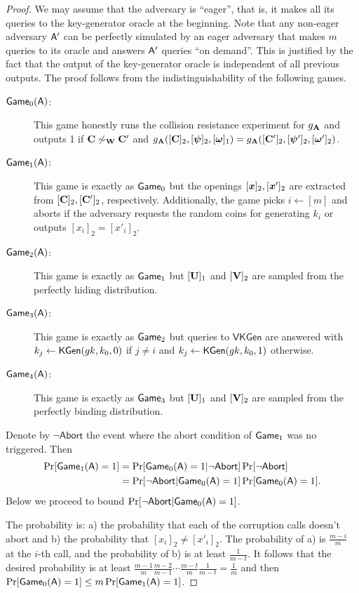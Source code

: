 \begin{proof}
We may assume that the adversary is ``eager'', that is, it makes all its queries to the key-generator oracle at the beginning. Note that any non-eager adversary $\mathsf{A}'$ can be perfectly simulated  by an eager adversary that makes $m$ queries to its oracle and answers $\mathsf{A}'$ queries ``on demand''. This is justified by the fact that the output of the key-generator oracle is independent of all previous outputs.
The proof follows from the indistinguishability of the following games.
\begin{description}
\item[$\mathsf{Game}_0(\mathsf{A})$:] This game honestly runs the collision resistance experiment for $g_{\mathbf{{A}}}$ and outputs 1 if $\mathbf{{C}} \not\sim_{\mathbf{{W}}} \mathbf{{C}}'$ and $g_{\mathbf{{A}}}([\mathbf{{C}}]_2,[{\boldsymbol{\psi}}]_2,[{\boldsymbol{\omega}}]_1)=g_{\mathbf{{A}}}([\mathbf{{C}}']_2,[{\boldsymbol{\psi}}']_2,\allowbreak[{\boldsymbol{\omega}}']_2)$.
\item[$\mathsf{Game}_1(\mathsf{A})$:] This game is exactly as $\mathsf{Game}_0$ but the openings $[{\boldsymbol{x}}]_2,[{\boldsymbol{x}}']_2$ are extracted from $[\mathbf{{C}}]_2,[\mathbf{{C}}']_2$, respectively. Additionally, the game picks $i\gets[m]$ and aborts if the adversary requests the random coins for generating $k_i$ or outputs $[x_i]_2=[x'_i]_2$.
\item[$\mathsf{Game}_2(\mathsf{A})$:] This game is exactly as $\mathsf{Game}_1$ but $[\mathbf{{U}}]_1$ and $[\mathbf{{V}}]_2$ are sampled from the perfectly hiding distribution.
\item[$\mathsf{Game}_3(\mathsf{A})$:] This game is exactly as $\mathsf{Game}_2$ but queries to $\mathsf{VKGen}$ are answered with $k_j\gets\mathsf{KGen}(gk,k_0,0)$ if $j\neq i$ and $k_j\gets\mathsf{KGen}(gk,k_0,1)$ otherwise.
\item[$\mathsf{Game}_4(\mathsf{A})$:] This game is exactly as $\mathsf{Game}_3$ but $[\mathbf{{U}}]_1$ and $[\mathbf{{V}}]_2$ are sampled from the perfectly binding distribution.
\end{description}
Denote by $\neg\mathsf{Abort}$ the event where the abort condition of $\mathsf{Game}_1$ was no triggered. Then
\begin{align*}
\Pr[\mathsf{Game}_1(\mathsf{A})=1] &= \Pr[\mathsf{Game}_0(\mathsf{A})=1|\neg\mathsf{Abort}]\Pr[\neg\mathsf{Abort}]\\
&=\Pr[\neg\mathsf{Abort}|\mathsf{Game}_0(\mathsf{A})=1]\Pr[\mathsf{Game}_0(\mathsf{A})=1].
\end{align*}
Below we proceed to bound $\Pr[\neg\mathsf{Abort}|\mathsf{Game}_0(\mathsf{A})=1]$.

The probability is: a) the probability that each of the corruption calls doesn't abort and b) the probability that $[x_i]_2\neq[x'_i]_2$. The probability of a) is $\frac{m-i}{m}$ at the $i$-th call, and the probability of b) is at least $\frac{1}{m-t}$. It follows that the desired probability is at least $\frac{m-1}{m}\frac{m-2}{m-1}\cdots\frac{m-t}{m}\frac{1}{m-t}=\frac{1}{m}$ and then $\Pr[\mathsf{Game}_0(\mathsf{A})=1]\leq m \Pr[\mathsf{Game}_1(\mathsf{A})=1]$.


\end{proof}
